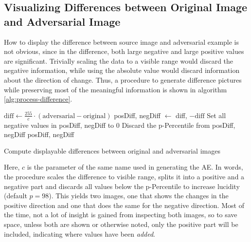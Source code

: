 \documentclass[11pt, a4paper]{article}
\newcommand\braces[1]{\left(#1\right)}
\begin{document}
\begin{appendix}
	\section{Visualizing Differences between Original Image and Adver\-sarial Image}
	\label{sec:visualizing-diff}
	How to display the difference between source image and adversarial example is not obvious, since in the difference, both large negative and large positive values are significant. Trivially scaling the data to a visible range would discard the negative information, while using the absolute value would discard information about the direction of change. Thus, a procedure to generate difference pictures while preserving most of the meaningful information is shown in algorithm \ref{alg:process-difference}.
	
\begin{algorithm}
	\begin{algorithmic}
			\State $\text{diff} \gets \frac{255}{c} \cdot \braces{\text{adversarial} - \text{original}}$
			\State posDiff, negDiff $\gets$ diff, $- \text{diff}$
			\State
			\State Set all negative values in posDiff, negDiff to 0
			\State Discard the p-Percentile from posDiff, negDiff
			\State
			\State \Return posDiff, negDiff
		\EndFunction
	\end{algorithmic}
	\caption[Displaying differences between original and adversarial images]{Compute displayable differences between original and adversarial images}
	\label{alg:process-difference}
\end{algorithm}
	
	Here, $c$ is the parameter of the same name used in generating the AE. In words, the procedure scales the difference to visible range, splits it into a positive and a negative part and discards all values below the p-Percentile to increase lucidity (default $p = 98$). This yields two images, one that shows the changes in the positive direction and one that does the same for the negative direction. Most of the time, not a lot of insight is gained from inspecting both images, so to save space, unless both are shown or otherwise noted, only the positive part will be included, indicating where values have been \emph{added}.
\end{appendix}

\listoffigures
\listoftables
\listofalgorithms



\end{document}
